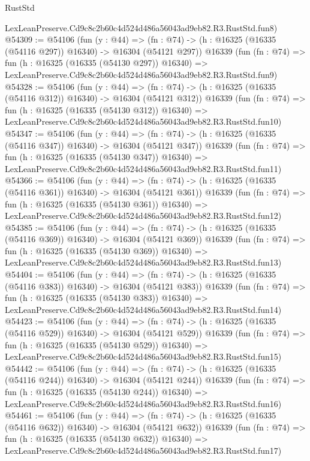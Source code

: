 \begin{lexlean}{RustStd}
\begin{coremodule}
    LexLeanPreserve.Cd9c8c2b60c4d524d486a56043ad9eb82.R3.RustStd.fun8)
@54309 := @54106
    (fun (y : @44) =>
    (fn : @74) -> (h : @16325 (@16335 (@54116 @297)) @16340) -> @16304 (@54121 @297))
    @16339
    (fun (fn : @74) =>
    fun (h : @16325 (@16335 (@54130 @297)) @16340) =>
    LexLeanPreserve.Cd9c8c2b60c4d524d486a56043ad9eb82.R3.RustStd.fun9)
@54328 := @54106
    (fun (y : @44) =>
    (fn : @74) -> (h : @16325 (@16335 (@54116 @312)) @16340) -> @16304 (@54121 @312))
    @16339
    (fun (fn : @74) =>
    fun (h : @16325 (@16335 (@54130 @312)) @16340) =>
    LexLeanPreserve.Cd9c8c2b60c4d524d486a56043ad9eb82.R3.RustStd.fun10)
@54347 := @54106
    (fun (y : @44) =>
    (fn : @74) -> (h : @16325 (@16335 (@54116 @347)) @16340) -> @16304 (@54121 @347))
    @16339
    (fun (fn : @74) =>
    fun (h : @16325 (@16335 (@54130 @347)) @16340) =>
    LexLeanPreserve.Cd9c8c2b60c4d524d486a56043ad9eb82.R3.RustStd.fun11)
@54366 := @54106
    (fun (y : @44) =>
    (fn : @74) -> (h : @16325 (@16335 (@54116 @361)) @16340) -> @16304 (@54121 @361))
    @16339
    (fun (fn : @74) =>
    fun (h : @16325 (@16335 (@54130 @361)) @16340) =>
    LexLeanPreserve.Cd9c8c2b60c4d524d486a56043ad9eb82.R3.RustStd.fun12)
@54385 := @54106
    (fun (y : @44) =>
    (fn : @74) -> (h : @16325 (@16335 (@54116 @369)) @16340) -> @16304 (@54121 @369))
    @16339
    (fun (fn : @74) =>
    fun (h : @16325 (@16335 (@54130 @369)) @16340) =>
    LexLeanPreserve.Cd9c8c2b60c4d524d486a56043ad9eb82.R3.RustStd.fun13)
@54404 := @54106
    (fun (y : @44) =>
    (fn : @74) -> (h : @16325 (@16335 (@54116 @383)) @16340) -> @16304 (@54121 @383))
    @16339
    (fun (fn : @74) =>
    fun (h : @16325 (@16335 (@54130 @383)) @16340) =>
    LexLeanPreserve.Cd9c8c2b60c4d524d486a56043ad9eb82.R3.RustStd.fun14)
@54423 := @54106
    (fun (y : @44) =>
    (fn : @74) -> (h : @16325 (@16335 (@54116 @529)) @16340) -> @16304 (@54121 @529))
    @16339
    (fun (fn : @74) =>
    fun (h : @16325 (@16335 (@54130 @529)) @16340) =>
    LexLeanPreserve.Cd9c8c2b60c4d524d486a56043ad9eb82.R3.RustStd.fun15)
@54442 := @54106
    (fun (y : @44) =>
    (fn : @74) -> (h : @16325 (@16335 (@54116 @244)) @16340) -> @16304 (@54121 @244))
    @16339
    (fun (fn : @74) =>
    fun (h : @16325 (@16335 (@54130 @244)) @16340) =>
    LexLeanPreserve.Cd9c8c2b60c4d524d486a56043ad9eb82.R3.RustStd.fun16)
@54461 := @54106
    (fun (y : @44) =>
    (fn : @74) -> (h : @16325 (@16335 (@54116 @632)) @16340) -> @16304 (@54121 @632))
    @16339
    (fun (fn : @74) =>
    fun (h : @16325 (@16335 (@54130 @632)) @16340) =>
    LexLeanPreserve.Cd9c8c2b60c4d524d486a56043ad9eb82.R3.RustStd.fun17)

\end{coremodule}
\end{lexlean}
